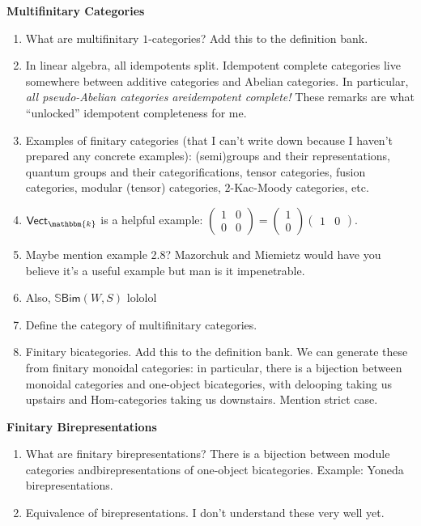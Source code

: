 \noindent\textbf{Multifinitary Categories}
\begin{enumerate}[label=$\bullet$, leftmargin=1\parindent]
\item What are multifinitary $1$-categories? Add this to the definition bank.
\item In linear algebra, all idempotents split. Idempotent complete categories live somewhere between additive categories and Abelian categories. In particular, {\em all pseudo-Abelian categories are\linebreak idempotent complete!} These remarks are what ``unlocked'' idempotent completeness for me.
\item Examples of finitary categories (that I can't write down because I haven't prepared any concrete examples): (semi)groups and their representations, quantum groups and their categorifications, tensor categories, fusion categories, modular (tensor) categories, $2$-Kac-Moody categories, etc.
\item $\textsf{Vect}_\mathbbm{k}$ is a helpful example: $\begin{pmatrix}1&0\\0&0\end{pmatrix} = \begin{pmatrix}1\\0\end{pmatrix}\!\begin{pmatrix}1&0\end{pmatrix}$.
\item Maybe mention example 2.8? Mazorchuk and Miemietz would have you believe it's a useful example but man is it impenetrable.
\item Also, $\mathbb{S}\textsf{Bim}(W, S)$ lololol
\item Define the category of multifinitary categories.
\item Finitary bicategories. Add this to the definition bank. We can generate these from finitary monoidal categories: in particular, there is a bijection between monoidal categories and one-object bicategories, with delooping taking us upstairs and Hom-categories taking us downstairs. Mention strict case.
\end{enumerate}
\newpage

\noindent\textbf{Finitary Birepresentations}
\begin{enumerate}[label=$\bullet$, leftmargin=1\parindent]
\item What are finitary birepresentations? There is a bijection between module categories and\linebreak birepresentations of one-object bicategories. Example: Yoneda birepresentations.
\item Equivalence of birepresentations. I don't understand these very well yet.\\
\end{enumerate}

